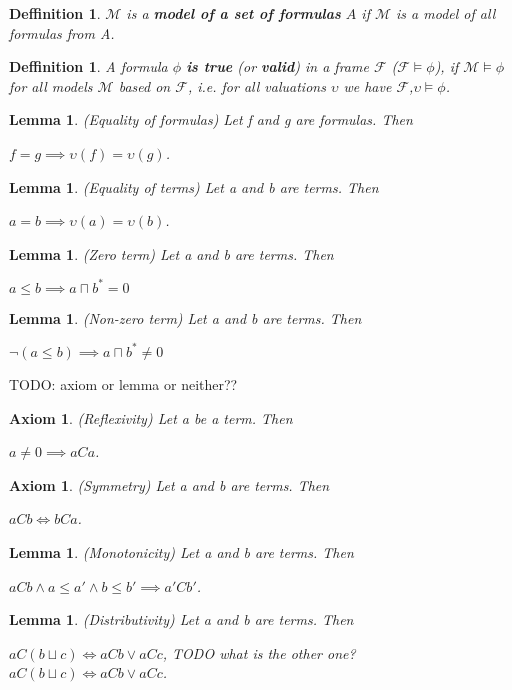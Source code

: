 \documentclass{article}
\newcommand\M{\mathcal{M}}
\newcommand\F{\mathcal{F}}
\newtheorem{lemma}[theorem]{Lemma}
\newtheorem{axiom}[theorem]{Axiom}
\newtheorem{defn}[theorem]{Deffinition}
\begin{document}
	\begin{defn}
		$\M$ is a \textbf{model of a set of formulas} $A$ if $\M$ is a model of all formulas from A.
	\end{defn}

	\begin{defn} A formula $\phi$ \textbf{is \textit{true}} (or \textbf{valid}) in a frame $\F$ ($\F \models \phi$), if $\M \models \phi$ for all models $\M$ based on $\F$, i.e. for all valuations $\upsilon$ we have $\F$,$\upsilon \models \phi$.
	\end{defn}

	\begin{lemma}
		(Equality of formulas) Let f and g are formulas. Then \par $f = g \implies \upsilon(f) = \upsilon(g)$.
	\end{lemma}

	\begin{lemma}
		(Equality of terms) Let a and b are terms. Then \par $a = b \implies \upsilon(a) = \upsilon(b)$.
	\end{lemma}

	\begin{lemma} (Zero term) Let a and b are terms. Then \par $a \leq b \implies a \sqcap b^*=0$
	\end{lemma}

	\begin{lemma} (Non-zero term) Let a and b are terms. Then \par $\neg(a \leq b) \implies a \sqcap b^* \neq 0$
	\end{lemma}

	TODO: axiom or lemma or neither??
	\begin{axiom}
		(Reflexivity) Let a be a term. Then \par $ a \neq 0 \implies aCa$.
	\end{axiom}

	\begin{axiom}
		(Symmetry) Let a and b are terms. Then \par $aCb \iff bCa$.
	\end{axiom}

	\begin{lemma}
		(Monotonicity) Let a and b are terms. Then \par $aCb \land a \leq a' \land b \leq b' \implies a'Cb'$.
	\end{lemma}

	\begin{lemma}
		(Distributivity) Let a and b are terms. Then \par $aC(b \sqcup c) \iff aCb \lor aCc$, \; TODO what is the other one? $aC(b \sqcup c) \iff aCb \lor aCc$.
	\end{lemma}
\end{document}
